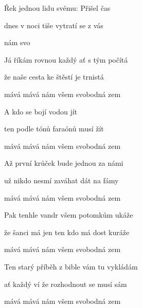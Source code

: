 

\zs
Řek  jednou lidu svému: Přišel čas

dnes v noci tiše vytratí se  z vás

 

nám  svo 
\ks

\zs
Já říkám rovnou každý ať s tým počítá

že naše cesta ke štěstí je trnistá

mává mává nám všem svobodná zem
\ks

\zr
A kdo se bojí vodou jít

ten podle tónů faraónů musí žít

mává mává nám všem svobodná zem
\kr

\zs
Až první krůček bude jednou za námi

už nikdo nesmí zaváhat dát na fámy

mává mává nám všem svobodná zem
\ks

\zs
Pak tenhle vandr všem potomkům ukáže

že šanci má jen ten kdo má dost kuráže

mává mává nám všem svobodná zem
\ks

\zs
Ten starý příběh z bible vám tu vykládám

ať každý ví že rozhodnout se musí sám

mává mává nám všem svobodná zem
\ks

\kp






